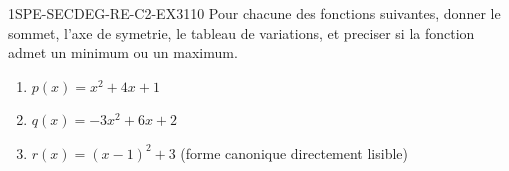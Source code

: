 
\begin{exercice}{1SPE-SECDEG-RE-C2-EX3}{1}{10}
Pour chacune des fonctions suivantes, donner le sommet, l'axe de symetrie, le tableau de variations, et preciser si la fonction admet un minimum ou un maximum.
\begin{enumerate}
  \item $p(x) = x^2 + 4x + 1$
  \item $q(x) = -3x^2 + 6x + 2$
  \item $r(x) = (x-1)^2 + 3$ \quad (forme canonique directement lisible)
\end{enumerate}
\end{exercice}


